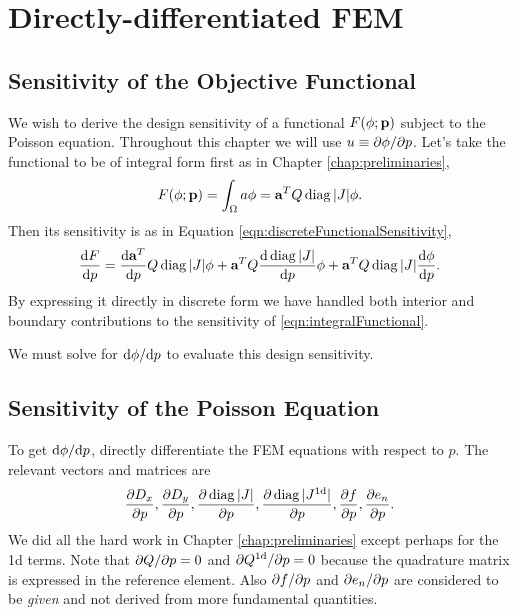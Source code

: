 \chapter{Directly-differentiated FEM}
\label{chap:ddfem}

\section{Sensitivity of the Objective Functional}

We wish to derive the design sensitivity of a functional $F(\phi; \textbf{p})$ subject to the Poisson equation.  Throughout this chapter we will use $u \equiv \partial{\phi}/\partial{p}$.  Let's take the functional to be of integral form first as in Chapter \ref{chap:preliminaries},
%
\begin{equation}
F(\phi; \textbf{p}) = \int_\Omega a \phi = \textbf{a}^T Q \operatorname{diag} |J| \phi.
\label{eqn:integralFunctional}
\end{equation}
%
Then its sensitivity is as in Equation \ref{eqn:discreteFunctionalSensitivity},
%
\begin{equation}
\frac{\mathrm{d}{F}}{\mathrm{d}{p}} = \frac{\mathrm{d}{\textbf{a}^T}}{\mathrm{d}{p}} Q \operatorname{diag} |J| \phi + \textbf{a}^T Q \frac{\mathrm{d}{\, \operatorname{diag} |J|}}{\mathrm{d}{p}} \phi + \textbf{a}^T Q \operatorname{diag} |J| \frac{\mathrm{d}{\phi}}{\mathrm{d}{p}}.
\label{eqn:integralFunctionalSensitivity}
\end{equation}
%
By expressing it directly in discrete form we have handled both interior and boundary contributions to the sensitivity of \ref{eqn:integralFunctional}.

We must solve for $\mathrm{d}{\phi}/\mathrm{d}{p}$ to evaluate this design sensitivity.


\section{Sensitivity of the Poisson Equation}

To get $\mathrm{d}{\phi}/\mathrm{d}{p}$, directly differentiate the FEM equations with respect to $p$.  The relevant vectors and matrices are
%
\begin{equation}
\begin{aligned}
\frac{\partial{D_x}}{\partial{p}}, 
\frac{\partial{D_y}}{\partial{p}}, 
\frac{\partial{\, \operatorname{diag}|J|}}{\partial{p}}, 
\frac{\partial{\, \operatorname{diag}|J^\textrm{1d}|}}{\partial{p}}, 
\frac{\partial{f}}{\partial{p}}, 
\frac{\partial{e_n}}{\partial{p}}.
\end{aligned}
\end{equation}
%
We did all the hard work in Chapter \ref{chap:preliminaries} except perhaps for the 1d terms.  Note that $\partial{Q}/\partial{p} = 0$ and $\partial{Q^\textrm{1d}}/\partial{p} = 0$ because the quadrature matrix is expressed in the reference element.  Also $\partial{f}/\partial{p}$ and $\partial{e_n}/\partial{p}$ are considered to be \emph{given} and not derived from more fundamental quantities.

